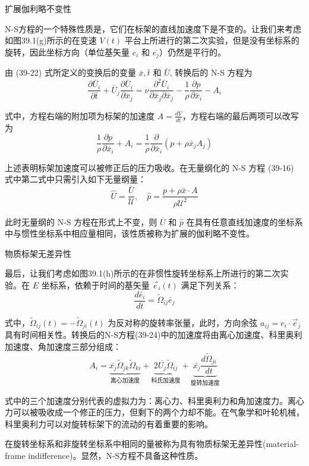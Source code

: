 \documentclass[12pt, a4paper, oneside, UTF8]{ctexbook}  %
\begin{document}
\begin{proposition}
    扩展伽利略不变性

N-S方程的一个特殊性质是，它们在标架的直线加速度下是不变的。让我们来考虑如图39.1(g)所示的在变速 \( V(t) \) 平台上所进行的第二次实验，但是没有坐标系的旋转，因此坐标方向（单位基矢量 \( e_i \) 和 \( \overline{e_j} \)）仍然是平行的。

由 (39-22) 式所定义的变换后的变量 \(\bar{x}, \bar{t}\) 和 \(\bar{U}\), 转换后的 N-S 方程为
\[
\frac{\partial \bar{U}_i}{\partial \bar{t}} + \bar{U}_j \frac{\partial \bar{U}_i}{\partial \bar{x}_j} = \nu \frac{\partial^2 \bar{U}_i}{\partial \bar{x}_j \partial \bar{x}_j} - \frac{1}{\rho} \frac{\partial p}{\partial \bar{x}_i} - A_i \tag{39-24}
\]

式中，方程右端的附加项为标架的加速度 \(A = \frac{dV}{dt}\)，方程右端的最后两项可以改写为
\[
\frac{1}{\rho} \frac{\partial p}{\partial \bar{x}_i} + A_i = \frac{1}{\rho} \frac{\partial}{\partial \bar{x}_i} (p + \rho \bar{x}_j A_j) \tag{39-25}
\]

上述表明标架加速度可以被修正后的压力吸收。在无量纲化的 N-S 方程 (39-16) 式中第二式中只需引入如下无量纲量：
\[
\hat{U} = \frac{\bar{U}}{\mathcal{U}}, \quad \hat{p} = \frac{p + \rho \bar{x} \cdot A}{\rho \mathcal{U}^2} \tag{39-26}
\]

此时无量纲的 N-S 方程在形式上不变，则 \(\bar{U}\) 和 \(\hat{p}\) 在具有任意直线加速度的坐标系中与惯性坐标系中相应量相同，该性质被称为扩展的伽利略不变性。
\end{proposition}
\begin{proposition}
    物质标架无差异性

最后，让我们考虑如图39.1(h)所示的在非惯性旋转坐标系上所进行的第二次实验。在 \( E \) 坐标系，依赖于时间的基矢量 \( \vec{e}_i(t) \) 满足下列关系：
\[
\frac{d\bar{e}_i}{dt} = \tilde{\Omega}_{ij}\bar{e}_j \tag{39-27}
\]

式中，\( \tilde{\Omega}_{ij}(t) = -\tilde{\Omega}_{ji}(t) \) 为反对称的旋转率张量，此时，方向余弦 \( a_{ij} = e_i \cdot \vec{e}_j \) 具有时间相关性。转换后的N-S方程(39-24)中的加速度将由离心加速度、科里奥利加速度、角加速度三部分组成：
\[
A_i = \underbrace{\bar{x_j}\tilde{\Omega}_{jk} \tilde{\Omega}_{ki}}_{\text{离心加速度}} + \underbrace{2\bar{U_j} \tilde{\Omega}_{ij}}_{\text{科氏加速度}} + \underbrace{\bar{x_j} \frac{d\tilde{\Omega}_{ji}}{dt}}_{\text{旋转加速度}} \tag{39-28}
\]

式中的三个加速度分别代表的虚拟力为：离心力、科里奥利力和角加速度力。离心力可以被吸收成一个修正的压力，但剩下的两个力却不能。在气象学和叶轮机械，科里奥利力可以对旋转标架下的流动的有着重要的影响。

在旋转坐标系和非旋转坐标系中相同的量被称为具有物质标架无差异性(material-frame indifference)。显然，N-S方程不具备这种性质。
\end{proposition}
\end{document}
